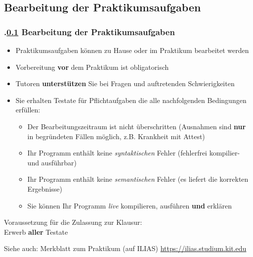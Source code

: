 \def\stitle{Bearbeitung der Praktikumsaufgaben}%
\subsection{\stitle}\label{S:Praktikum}
\begin{frame}[fragile]%
  \frametitle{\kap.\ref{S:Praktikum} \stitle}%
\medskip

\begin{itemize}
  \item Praktikumsaufgaben k\"onnen zu Hause oder im Praktikum bearbeitet werden
  \item Vorbereitung \textbf{vor} dem Praktikum ist obligatorisch
  \item Tutoren \textbf{unterst\"utzen} Sie bei Fragen und auftretenden Schwierigkeiten
  \item Sie erhalten Testate f\"ur Pflichtaufgaben die alle nachfolgenden Bedingungen erf\"ullen:
  \begin{itemize}
    \item Der Bearbeitungszeitraum ist nicht \"uberschritten (Ausnahmen sind \textbf{nur} in begr\"undeten F\"allen m\"oglich, z.B. Krankheit mit Attest)
    \item Ihr Programm enth\"alt keine \emph{syntaktischen} Fehler (fehlerfrei kompilier- und ausf\"uhrbar)
    \item Ihr Programm enth\"alt keine \emph{semantischen} Fehler (es liefert die korrekten Ergebnisse)
    \item Sie k\"onnen Ihr Programm \emph{live} kompilieren, ausf\"uhren \textbf{und} erkl\"aren
  \end{itemize}
\end{itemize}
\medskip

\begin{center}
 \LARGE{Voraussetzung f\"ur die Zulassung zur Klausur:\\ Erwerb \textbf{aller} Testate}
\end{center}
\medskip

Siehe auch: Merkblatt zum Praktikum (auf ILIAS) \url{https://ilias.studium.kit.edu}
\end{frame}


\def\stitle{Einordnung und Zusammenfassung}%
